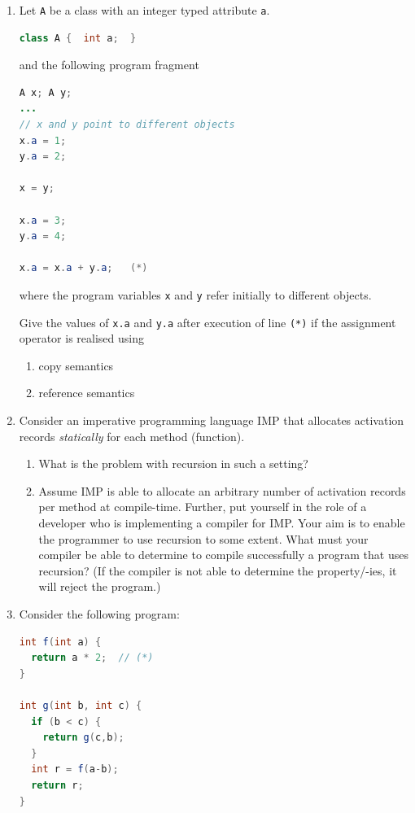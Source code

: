 \documentclass{article}
\begin{document}
\begin{enumerate}
\item Let \lstinline!A! be a class with an integer typed attribute
  \lstinline!a!.
\begin{lstlisting}[language=Java, columns=flexible]
class A {  int a;  }
\end{lstlisting}

and the following program fragment
\begin{lstlisting}[language=Java, columns=flexible] 
A x; A y;
...
// x and y point to different objects
x.a = 1;
y.a = 2;

x = y;

x.a = 3;
y.a = 4;
      
x.a = x.a + y.a;   (*)
\end{lstlisting}
where the program variables \lstinline!x! and \lstinline!y! refer
initially to different objects.

Give the values of \lstinline!x.a! and \lstinline!y.a! after execution
of line \lstinline!(*)! if the assignment operator is realised using
\begin{enumerate}
  \item copy semantics 
  \item reference semantics 
\end{enumerate}
\item Consider an imperative programming language \textsf{IMP} that
  allocates activation records \emph{statically} for each method
  (function). 
  \begin{enumerate}
  \item What is the problem with recursion in such a setting?  
  \item Assume \textsf{IMP} is able to allocate an arbitrary number of
    activation records per method at compile-time. Further, put
    yourself in the role of a developer who is implementing a compiler
    for \textsf{IMP}. Your aim is to enable the programmer to use
    recursion to some extent. What must your compiler be able to
    determine to compile successfully a program that uses recursion?
    (If the compiler is not able to determine the property/-ies, it
    will reject the program.)
 \end{enumerate}
\item Consider the following program:
\begin{lstlisting}[language=Java, columns=flexible] 
int f(int a) {
  return a * 2;  // (*)
} 

int g(int b, int c) {
  if (b < c) {
    return g(c,b); 
  }
  int r = f(a-b);
  return r;
}
\end{lstlisting}


\end{enumerate}
\end{document}
